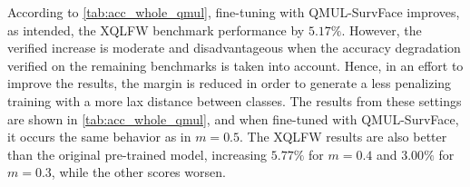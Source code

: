 \documentclass[class=report, crop=false, a4paper, 12pt]{standalone}
\begin{document}
\par According to \autoref{tab:acc_whole_qmul}, fine-tuning with QMUL-SurvFace improves, as intended, the XQLFW benchmark performance by $5.17\%$. However, the verified increase is moderate and disadvantageous when the accuracy degradation verified on the remaining benchmarks is taken into account. Hence, in an effort to improve the results, the margin is reduced in order to generate a less penalizing training with a more lax distance between classes. The results from these settings are shown in \autoref{tab:acc_whole_qmul}, and when fine-tuned with QMUL-SurvFace, it occurs the same behavior as in $m=0.5$. The XQLFW results are also better than the original pre-trained model, increasing $5.77\%$ for $m=0.4$ and $3.00\%$ for $m=0.3$, while the other scores worsen. 
\begin{table}[H]
    \centering
    \caption{MobileFaceNet accuracy scores before and after fine-tuning the whole network on DigiFace-1M with different ArcFace margins.}
    \label{tab:acc_whole_digiface}
\end{table}
\end{document}

